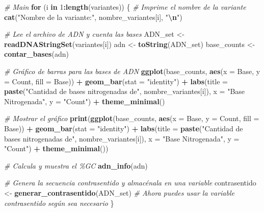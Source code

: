 \documentclass[
]{article}
\newenvironment{Shaded}{\begin{snugshade}}{\end{snugshade}}
\newcommand{\AttributeTok}[1]{\textcolor[rgb]{0.13,0.29,0.53}{#1}}
\newcommand{\CommentTok}[1]{\textcolor[rgb]{0.56,0.35,0.01}{\textit{#1}}}
\newcommand{\ControlFlowTok}[1]{\textcolor[rgb]{0.13,0.29,0.53}{\textbf{#1}}}
\newcommand{\DecValTok}[1]{\textcolor[rgb]{0.00,0.00,0.81}{#1}}
\newcommand{\FunctionTok}[1]{\textcolor[rgb]{0.13,0.29,0.53}{\textbf{#1}}}
\newcommand{\NormalTok}[1]{#1}
\newcommand{\OtherTok}[1]{\textcolor[rgb]{0.56,0.35,0.01}{#1}}
\newcommand{\SpecialCharTok}[1]{\textcolor[rgb]{0.81,0.36,0.00}{\textbf{#1}}}
\newcommand{\StringTok}[1]{\textcolor[rgb]{0.31,0.60,0.02}{#1}}
\begin{document}
\begin{Shaded}
\begin{Highlighting}[]
\CommentTok{\# Main}
\ControlFlowTok{for}\NormalTok{ (i }\ControlFlowTok{in} \DecValTok{1}\SpecialCharTok{:}\FunctionTok{length}\NormalTok{(variantes)) \{}
  \CommentTok{\# Imprime el nombre de la variante}
  \FunctionTok{cat}\NormalTok{(}\StringTok{"Nombre de la variante:"}\NormalTok{, nombre\_variantes[i], }\StringTok{"}\SpecialCharTok{\textbackslash{}n}\StringTok{"}\NormalTok{)}
  
  \CommentTok{\# Lee el archivo de ADN y cuenta las bases}
\NormalTok{  ADN\_set }\OtherTok{\textless{}{-}} \FunctionTok{readDNAStringSet}\NormalTok{(variantes[i])}
\NormalTok{  adn }\OtherTok{\textless{}{-}} \FunctionTok{toString}\NormalTok{(ADN\_set)}
\NormalTok{  base\_counts }\OtherTok{\textless{}{-}} \FunctionTok{contar\_bases}\NormalTok{(adn)}
  
  \CommentTok{\# Gráfico de barras para las bases de ADN}
  \FunctionTok{ggplot}\NormalTok{(base\_counts, }\FunctionTok{aes}\NormalTok{(}\AttributeTok{x =}\NormalTok{ Base, }\AttributeTok{y =}\NormalTok{ Count, }\AttributeTok{fill =}\NormalTok{ Base)) }\SpecialCharTok{+}
    \FunctionTok{geom\_bar}\NormalTok{(}\AttributeTok{stat =} \StringTok{"identity"}\NormalTok{) }\SpecialCharTok{+}
    \FunctionTok{labs}\NormalTok{(}\AttributeTok{title =} \FunctionTok{paste}\NormalTok{(}\StringTok{"Cantidad de bases nitrogenadas de"}\NormalTok{, nombre\_variantes[i]),}
         \AttributeTok{x =} \StringTok{"Base Nitrogenada"}\NormalTok{, }\AttributeTok{y =} \StringTok{"Count"}\NormalTok{) }\SpecialCharTok{+}
    \FunctionTok{theme\_minimal}\NormalTok{()}
  
  \CommentTok{\# Mostrar el gráfico}
  \FunctionTok{print}\NormalTok{(}\FunctionTok{ggplot}\NormalTok{(base\_counts, }\FunctionTok{aes}\NormalTok{(}\AttributeTok{x =}\NormalTok{ Base, }\AttributeTok{y =}\NormalTok{ Count, }\AttributeTok{fill =}\NormalTok{ Base)) }\SpecialCharTok{+}
          \FunctionTok{geom\_bar}\NormalTok{(}\AttributeTok{stat =} \StringTok{"identity"}\NormalTok{) }\SpecialCharTok{+}
          \FunctionTok{labs}\NormalTok{(}\AttributeTok{title =} \FunctionTok{paste}\NormalTok{(}\StringTok{"Cantidad de bases nitrogenadas de"}\NormalTok{, nombre\_variantes[i]),}
               \AttributeTok{x =} \StringTok{"Base Nitrogenada"}\NormalTok{, }\AttributeTok{y =} \StringTok{"Count"}\NormalTok{) }\SpecialCharTok{+}
          \FunctionTok{theme\_minimal}\NormalTok{())}
  
  \CommentTok{\# Calcula y muestra el \%GC}
  \FunctionTok{adn\_info}\NormalTok{(adn)}
  
  \CommentTok{\# Genera la secuencia contrasentido y almacénala en una variable}
\NormalTok{  contrasentido }\OtherTok{\textless{}{-}} \FunctionTok{generar\_contrasentido}\NormalTok{(ADN\_set)}
  \CommentTok{\# Ahora puedes usar la variable \textquotesingle{}contrasentido\textquotesingle{} según sea necesario}
\NormalTok{\}}
\end{Highlighting}
\end{Shaded}
\end{document}
